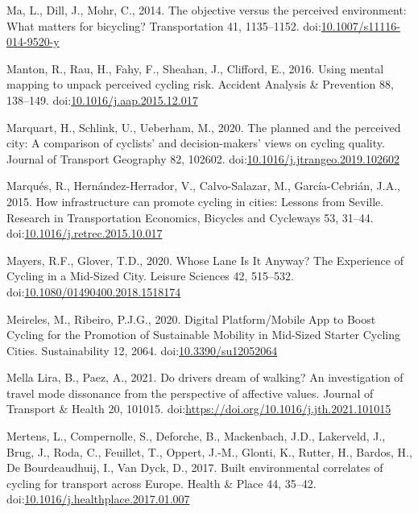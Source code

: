 \documentclass[]{elsarticle} %
\begin{document}
\leavevmode\hypertarget{ref-maObjectivePerceivedEnvironment2014}{}%
Ma, L., Dill, J., Mohr, C., 2014. The objective versus the perceived
environment: What matters for bicycling? Transportation 41, 1135--1152.
doi:\href{https://doi.org/10.1007/s11116-014-9520-y}{10.1007/s11116-014-9520-y}

\leavevmode\hypertarget{ref-mantonUsingMentalMapping2016}{}%
Manton, R., Rau, H., Fahy, F., Sheahan, J., Clifford, E., 2016. Using
mental mapping to unpack perceived cycling risk. Accident Analysis \&
Prevention 88, 138--149.
doi:\href{https://doi.org/10.1016/j.aap.2015.12.017}{10.1016/j.aap.2015.12.017}

\leavevmode\hypertarget{ref-marquartPlannedPerceivedCity2020}{}%
Marquart, H., Schlink, U., Ueberham, M., 2020. The planned and the
perceived city: A comparison of cyclists' and decision-makers' views on
cycling quality. Journal of Transport Geography 82, 102602.
doi:\href{https://doi.org/10.1016/j.jtrangeo.2019.102602}{10.1016/j.jtrangeo.2019.102602}

\leavevmode\hypertarget{ref-marquesHowInfrastructureCan2015a}{}%
Marqués, R., Hernández-Herrador, V., Calvo-Salazar, M., García-Cebrián,
J.A., 2015. How infrastructure can promote cycling in cities: Lessons
from Seville. Research in Transportation Economics, Bicycles and
Cycleways 53, 31--44.
doi:\href{https://doi.org/10.1016/j.retrec.2015.10.017}{10.1016/j.retrec.2015.10.017}

\leavevmode\hypertarget{ref-mayersWhoseLaneIt2020}{}%
Mayers, R.F., Glover, T.D., 2020. Whose Lane Is It Anyway? The
Experience of Cycling in a Mid-Sized City. Leisure Sciences 42,
515--532.
doi:\href{https://doi.org/10.1080/01490400.2018.1518174}{10.1080/01490400.2018.1518174}

\leavevmode\hypertarget{ref-meirelesDigitalPlatformMobile2020}{}%
Meireles, M., Ribeiro, P.J.G., 2020. Digital Platform/Mobile App to
Boost Cycling for the Promotion of Sustainable Mobility in Mid-Sized
Starter Cycling Cities. Sustainability 12, 2064.
doi:\href{https://doi.org/10.3390/su12052064}{10.3390/su12052064}

\leavevmode\hypertarget{ref-mellaDoDrivers2021}{}%
Mella Lira, B., Paez, A., 2021. Do drivers dream of walking? An
investigation of travel mode dissonance from the perspective of
affective values. Journal of Transport \& Health 20, 101015.
doi:\href{https://doi.org/https://doi.org/10.1016/j.jth.2021.101015}{https://doi.org/10.1016/j.jth.2021.101015}

\leavevmode\hypertarget{ref-mertensBuiltEnvironmentalCorrelates2017}{}%
Mertens, L., Compernolle, S., Deforche, B., Mackenbach, J.D., Lakerveld,
J., Brug, J., Roda, C., Feuillet, T., Oppert, J.-M., Glonti, K., Rutter,
H., Bardos, H., De Bourdeaudhuij, I., Van Dyck, D., 2017. Built
environmental correlates of cycling for transport across Europe. Health
\& Place 44, 35--42.
doi:\href{https://doi.org/10.1016/j.healthplace.2017.01.007}{10.1016/j.healthplace.2017.01.007}
\end{document}
